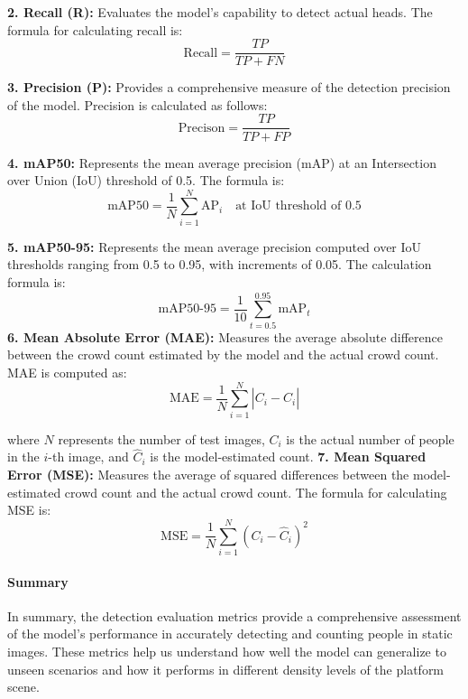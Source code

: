 \textbf{2. Recall (R):} Evaluates the model's capability to detect actual heads. The formula for calculating recall is:
\begin{equation}
    \text{Recall} = \frac{TP}{TP + FN}
\end{equation}

\textbf{3. Precision (P): }Provides a comprehensive measure of the detection precision of the model. Precision is calculated as follows:
\begin{equation}
    \text{Precison} = \frac{TP}{TP + FP}
\end{equation}

\textbf{4. mAP50: }Represents the mean average precision (mAP) at an Intersection over Union (IoU) threshold of 0.5. The formula is:
\begin{equation}
    \text{mAP50} =  \frac{1}{N}\sum_{i=1}^{N}\text{AP}_i \quad \text{at IoU threshold of 0.5}
\end{equation}

\textbf{5. mAP50-95:} Represents the mean average precision computed over IoU thresholds ranging from 0.5 to 0.95, with increments of 0.05. The calculation formula is:
\begin{equation}
    \text{mAP50-95} = \frac{1}{10}\sum_{t=0.5}^{0.95}\text{mAP}_t
\end{equation}
\textbf{6. Mean Absolute Error (MAE):} Measures the average absolute difference between the crowd count estimated by the model and the actual crowd count. MAE is computed as:
\begin{equation}
    \text{MAE} = \frac{1}{N}\sum_{i=1}^{N}\left|C_i - \hat{C}_i\right|
\end{equation}    

where \( N \) represents the number of test images, \( C_i \) is the actual number of people in the \(i\)-th image, and \(\hat{C}_i\) is the model-estimated count.
\textbf{7. Mean Squared Error (MSE):} Measures the average of squared differences between the model-estimated crowd count and the actual crowd count. The formula for calculating MSE is:
\begin{equation}
    \text{MSE} = \frac{1}{N}\sum_{i=1}^{N}(C_i - \hat{C}_i)^2
\end{equation}

\paragraph{Summary}
In summary, the detection evaluation metrics provide a comprehensive assessment of the model's performance in accurately detecting and counting people in static images. These metrics help us understand how well the model can generalize to unseen scenarios and how it performs in different density levels of the platform scene.


